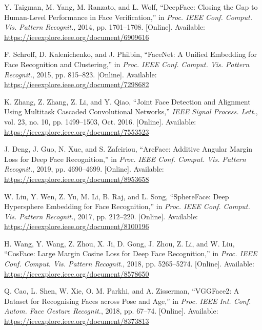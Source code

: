 \documentclass[conference]{IEEEtran}
\begin{document}
\begin{thebibliography}{00}

    Y. Taigman, M. Yang, M. Ranzato, and L. Wolf, ``DeepFace: Closing the Gap to Human-Level Performance in Face Verification,'' in \emph{Proc. IEEE Conf. Comput. Vis. Pattern Recognit.}, 2014, pp. 1701--1708. [Online]. Available: \url{https://ieeexplore.ieee.org/document/6909616}
    
    F. Schroff, D. Kalenichenko, and J. Philbin, ``FaceNet: A Unified Embedding for Face Recognition and Clustering,'' in \emph{Proc. IEEE Conf. Comput. Vis. Pattern Recognit.}, 2015, pp. 815--823. [Online]. Available: \url{https://ieeexplore.ieee.org/document/7298682}
    
    K. Zhang, Z. Zhang, Z. Li, and Y. Qiao, ``Joint Face Detection and Alignment Using Multitask Cascaded Convolutional Networks,'' \emph{IEEE Signal Process. Lett.}, vol. 23, no. 10, pp. 1499--1503, Oct. 2016. [Online]. Available: \url{https://ieeexplore.ieee.org/document/7553523}
    
    J. Deng, J. Guo, N. Xue, and S. Zafeiriou, ``ArcFace: Additive Angular Margin Loss for Deep Face Recognition,'' in \emph{Proc. IEEE Conf. Comput. Vis. Pattern Recognit.}, 2019, pp. 4690--4699. [Online]. Available: \url{https://ieeexplore.ieee.org/document/8953658}
    
    W. Liu, Y. Wen, Z. Yu, M. Li, B. Raj, and L. Song, ``SphereFace: Deep Hypersphere Embedding for Face Recognition,'' in \emph{Proc. IEEE Conf. Comput. Vis. Pattern Recognit.}, 2017, pp. 212--220. [Online]. Available: \url{https://ieeexplore.ieee.org/document/8100196}
    
    H. Wang, Y. Wang, Z. Zhou, X. Ji, D. Gong, J. Zhou, Z. Li, and W. Liu, ``CosFace: Large Margin Cosine Loss for Deep Face Recognition,'' in \emph{Proc. IEEE Conf. Comput. Vis. Pattern Recognit.}, 2018, pp. 5265--5274. [Online]. Available: \url{https://ieeexplore.ieee.org/document/8578650}
    
    Q. Cao, L. Shen, W. Xie, O. M. Parkhi, and A. Zisserman, ``VGGFace2: A Dataset for Recognising Faces across Pose and Age,'' in \emph{Proc. IEEE Int. Conf. Autom. Face Gesture Recognit.}, 2018, pp. 67--74. [Online]. Available: \url{https://ieeexplore.ieee.org/document/8373813}
    
    \end{thebibliography}
\end{document}
